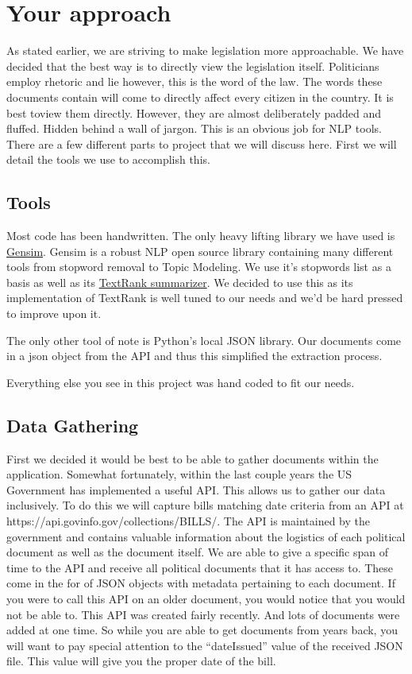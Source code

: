 \documentclass[11pt,a4paper]{article}
\begin{document}
\section{Your approach}
As stated earlier, we are striving to make legislation more approachable. We have decided that the best way is to directly view the legislation itself. Politicians employ rhetoric and lie however, this is the word of the law. The words these documents contain will come to directly affect every citizen in the country. It is best toview them directly. However, they are almost deliberately padded and fluffed. Hidden behind a wall of jargon. This is an obvious job for NLP tools. There are a few different parts to project that we will discuss here. First we will detail the tools we use to accomplish this. 

\subsection{Tools}
Most code has been handwritten. The only heavy lifting library we have used is \href{https://radimrehurek.com/gensim/}{Gensim}. Gensim is a robust NLP open source library containing many different tools from stopword removal to Topic Modeling. We use it's stopwords list as a basis as well as its \href{https://radimrehurek.com/gensim/summarization/summariser.html}{TextRank summarizer}. We decided to use this as its implementation of TextRank is well tuned to our needs and we'd be hard pressed to improve upon it. 

The only other tool of note is Python's local JSON library. Our documents come in a json object from the API and thus this simplified the extraction process. 

Everything else you see in this project was hand coded to fit our needs.

\subsection{Data Gathering}
First we decided it would be best to be able to gather documents within the application. Somewhat fortunately, within the last couple years the US Government has implemented a useful API. This allows us to gather our data inclusively. 
To do this we will capture bills matching date criteria from an API at https://api.govinfo.gov/collections/BILLS/. The API is maintained by the government and contains valuable information about the logistics of each political document as well as the document itself. We are able to give a specific span of time to the API and receive all political documents that it has access to. These come in the for of JSON objects with metadata pertaining to each document. If you were to call this API on an older document, you would notice that you would not be able to. This API was created fairly recently. And lots of documents were added at one time. So while you are able to get documents from years back, you will want to pay special attention to the “dateIssued” value of the received JSON file. This value will give you the proper date of the bill. 
\end{document}
